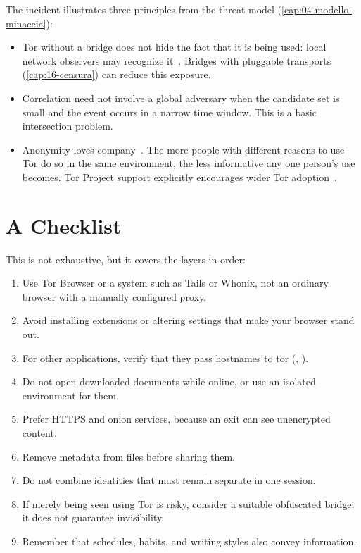 The incident illustrates three principles from the threat model (\cref{cap:04-modello-minaccia}):
\begin{itemize}
  \item Tor without a bridge does not hide the fact that it is being used: local network observers may recognize it~\cite{tailswarnings}. Bridges with pluggable transports (\cref{cap:16-censura}) can reduce this exposure.
  \item Correlation need not involve a global adversary when the candidate set is small and the event occurs in a narrow time window. This is a basic intersection problem.
  \item Anonymity loves company~\cite{dingledine2006company}. The more people with different reasons to use Tor do so in the same environment, the less informative any one person's use becomes. Tor Project support explicitly encourages wider Tor adoption~\cite{torsafety}.
\end{itemize}

\section{A Checklist}\label{sec:opsec-lista}

This is not exhaustive, but it covers the layers in order:
\begin{enumerate}
  \item Use Tor Browser or a system such as Tails or Whonix, not an ordinary browser with a manually configured proxy.
  \item Avoid installing extensions or altering settings that make your browser stand out.
  \item For other applications, verify that they pass hostnames to tor (, ).
  \item Do not open downloaded documents while online, or use an isolated environment for them.
  \item Prefer HTTPS and onion services, because an exit can see unencrypted content.
  \item Remove metadata from files before sharing them.
  \item Do not combine identities that must remain separate in one session.
  \item If merely being seen using Tor is risky, consider a suitable obfuscated bridge; it does not guarantee invisibility.
  \item Remember that schedules, habits, and writing styles also convey information.
\end{enumerate}


